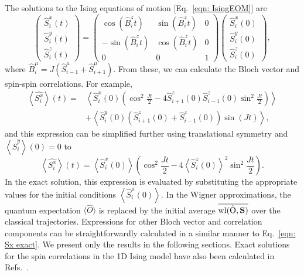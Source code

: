 \documentclass[pra,reprint,superscriptaddress]{revtex4-1}
\newcommand{\expect}[1]{\left\langle #1 \right\rangle}
\newcommand{\hS}{\hat{S}}
\newcommand{\hB}{\hat{B}}
\begin{document}
The solutions to the Ising equations of motion [Eq.~\eqref{eqn: IsingEOM}] are
\begin{equation}\label{eqn: IsingEOMSolns}
\left(\begin{array}{c}\hS^x_i(t)\\ \hS^y_i(t)\\ \hS^z_i(t)\end{array}\right) = \left(\begin{array}{ccc} \cos(\hB^z_it)&\sin(\hB^z_it)&0 \\ -\sin(\hB^z_it)&\cos(\hB^z_it)&0 \\ 0&0&1\end{array}\right)
\left(\begin{array}{c}\hS^x_i(0)\\ \hS^y_i(0)\\ \hS^z_i(0)\end{array}\right),
\end{equation}
where $\hB_i^\mu = J\left(\hS_{i-1}^\mu+\hS_{i+1}^\mu\right)$. From these, we can calculate the Bloch vector and spin-spin correlations. For example,
\begin{align}
\expect{\hat{S^x_i}}(t) = &\expect{\hS^x_i(0)\left(\cos^2\frac{Jt}{2}-4\hS^z_{i+1}(0)\hS^z_{i-1}(0)\sin^2\frac{Jt}{2}\right)}\nonumber\\ &+\expect{\hS^y_i(0)(\hS^z_{i+1}(0) + \hS^z_{i-1}(0))\sin(Jt)},
\end{align}
and this expression can be simplified further using translational symmetry and $\expect{\hS^y_i}(0)=0$ to
\begin{equation}
\expect{\hat{S^x_i}}(t) = \expect{\hS^x_i(0)}\left(\cos^2\frac{Jt}{2}-4\expect{\hS^z_i(0)}^2\sin^2\frac{Jt}{2}\right). \label{eqn: Sx exact}
\end{equation}
In the exact solution, this expression is evaluated by substituting the appropriate values for the initial conditions $\expect{\hS^\mu_i(0)}$. In the Wigner approximations, the quantum expectation $\langle\hat{O}\rangle$ is replaced by the initial average $\overline{\rm wl(\hat{O},\mathbf{S})}$ over the classical trajectories. Expressions for other Bloch vector and correlation components can be straightforwardly calculated in a similar manner to Eq.~\eqref{eqn: Sx exact}. We present only the results in the following sections. Exact solutions for the spin correlations in the 1D Ising model have also been calculated in Refs.~\cite{van2013relaxation, hazzard2014quantum}.
\end{document}
